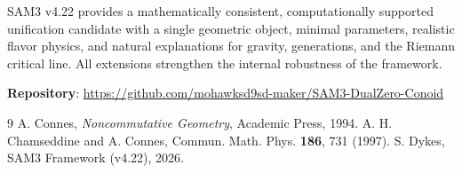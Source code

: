 \documentclass[11pt,a4paper]{article}
\begin{document}
SAM3 v4.22 provides a mathematically consistent, computationally supported unification candidate with a single geometric object, minimal parameters, realistic flavor physics, and natural explanations for gravity, generations, and the Riemann critical line. All extensions strengthen the internal robustness of the framework.

\vspace{1em}
\noindent\textbf{Repository}: \url{https://github.com/mohawksd9sd-maker/SAM3-DualZero-Conoid}

\begin{thebibliography}{9}
 A. Connes, \textit{Noncommutative Geometry}, Academic Press, 1994.
 A. H. Chamseddine and A. Connes, Commun. Math. Phys. \textbf{186}, 731 (1997).
 S. Dykes, SAM3 Framework (v4.22), 2026.
\end{thebibliography}
\end{document}
